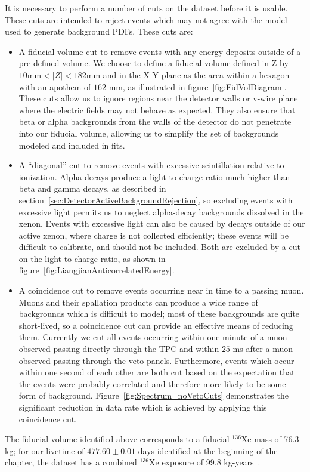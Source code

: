 It is necessary to perform a number of cuts on the dataset before it is usable.  These cuts are intended to reject events which may not agree with the model used to generate background PDFs.  These cuts are:~\cite{FittingDocument}
\begin{itemize}
\item A fiducial volume cut to remove events with any energy deposits outside of a pre-defined volume.  We choose to define a fiducial volume defined in Z by $10 \text{mm} < |Z| < 182 \text{mm}$ and in the X-Y plane as the area within a hexagon with an apothem of $162$ mm, as illustrated in figure~\ref{fig:FidVolDiagram}.  These cuts allow us to ignore regions near the detector walls or v-wire plane where the electric fields may not behave as expected.  They also ensure that beta or alpha backgrounds from the walls of the detector do not penetrate into our fiducial volume, allowing us to simplify the set of backgrounds modeled and included in fits.
\item A ``diagonal'' cut to remove events with excessive scintillation relative to ionization.  Alpha decays produce a light-to-charge ratio much higher than beta and gamma decays, as described in section~\ref{sec:DetectorActiveBackgroundRejection}, so excluding events with excessive light permits us to neglect alpha-decay backgrounds dissolved in the xenon.  Events with excessive light can also be caused by decays outside of our active xenon, where charge is not collected efficiently; these events will be difficult to calibrate, and should not be included.  Both are excluded by a cut on the light-to-charge ratio, as shown in figure~\ref{fig:LiangjianAnticorrelatedEnergy}.
\item A coincidence cut to remove events occurring near in time to a passing muon.  Muons and their spallation products can produce a wide range of backgrounds which is difficult to model; most of these backgrounds are quite short-lived, so a coincidence cut can provide an effective means of reducing them.  Currently we cut all events occurring within one minute of a muon observed passing directly through the TPC and within $25$ ms after a muon observed passing through the veto panels.  Furthermore, events which occur within one second of each other are both cut based on the expectation that the events were probably correlated and therefore more likely to be some form of background.  Figure~\ref{fig:Spectrum_noVetoCuts} demonstrates the significant reduction in data rate which is achieved by applying this coincidence cut.
\end{itemize}
The fiducial volume identified above corresponds to a fiducial $^{136}$Xe mass of 76.3 kg; for our livetime of $477.60 \pm 0.01$ days identified at the beginning of the chapter, the dataset has a combined $^{136}$Xe exposure of 99.8 kg-years~\cite{NewEXObb0nPaper_2014}.

